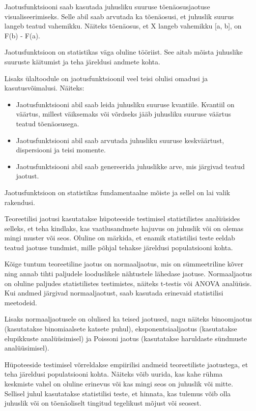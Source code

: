 \documentclass[
]{book}
\providecommand{\tightlist}{%
  \setlength{\itemsep}{0pt}\setlength{\parskip}{0pt}}
\begin{document}
Jaotusfunktsiooni saab kasutada juhusliku suuruse tõenäosusjaotuse visualiseerimiseks. Selle abil saab arvutada ka tõenäosusi, et juhuslik suurus langeb teatud vahemikku. Näiteks tõenäosus, et X langeb vahemikku {[}a, b{]}, on F(b) - F(a).

Jaotusfunktsioon on statistikas väga oluline tööriist. See aitab mõista juhuslike suuruste käitumist ja teha järeldusi andmete kohta.

Lisaks ülaltoodule on jaotusfunktsioonil veel teisi olulisi omadusi ja kasutusvõimalusi. Näiteks:

\begin{itemize}
\tightlist
\item
  Jaotusfunktsiooni abil saab leida juhusliku suuruse kvantiile. Kvantiil on väärtus, millest väiksemaks või võrdseks jääb juhusliku suuruse väärtus teatud tõenäosusega.
\item
  Jaotusfunktsiooni abil saab arvutada juhusliku suuruse keskväärtust, dispersiooni ja teisi momente.
\item
  Jaotusfunktsiooni abil saab genereerida juhuslikke arve, mis järgivad teatud jaotust.
\end{itemize}

Jaotusfunktsioon on statistikas fundamentaalne mõiste ja sellel on lai valik rakendusi.

Teoreetilisi jaotusi kasutatakse hüpoteeside testimisel statistilistes analüüsides selleks, et teha kindlaks, kas vaatlusandmete hajuvus on juhuslik või on olemas mingi muster või seos. Oluline on märkida, et enamik statistilisi teste eeldab teatud jaotuse tundmist, mille põhjal tehakse järeldusi populatsiooni kohta.

Kõige tuntum teoreetiline jaotus on normaaljaotus, mis on sümmeetriline kõver ning annab tihti paljudele looduslikele nähtustele lähedase jaotuse. Normaaljaotus on oluline paljudes statistilistes testimistes, näiteks t-testis või ANOVA analüüsis. Kui andmed järgivad normaaljaotust, saab kasutada erinevaid statistilisi meetodeid.

Lisaks normaaljaotusele on olulised ka teised jaotused, nagu näiteks binoomjaotus (kasutatakse binomiaalsete katsete puhul), eksponentsiaaljaotus (kasutatakse elupikkuste analüüsimisel) ja Poissoni jaotus (kasutatakse haruldaste sündmuste analüüsimisel).

Hüpoteeside testimisel võrreldakse empiirilisi andmeid teoreetiliste jaotustega, et teha järeldusi populatsiooni kohta. Näiteks võib uurida, kas kahe rühma keskmiste vahel on oluline erinevus või kas mingi seos on juhuslik või mitte. Sellisel juhul kasutatakse statistilisi teste, et hinnata, kas tulemus võib olla juhuslik või on tõenäoliselt tingitud tegelikust mõjust või seosest.
\end{document}
